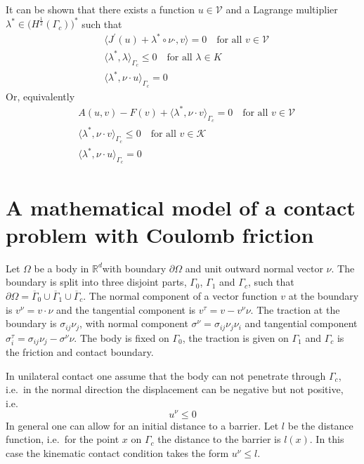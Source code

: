 \documentclass[12pt,a4paper]{article}
\numberwithin{equation}{section}
\numberwithin{table}{section}
\numberwithin{figure}{section}
\newcommand{\R}{\ensuremath{\mathbb{R}}}
\newcommand{\Rd}{\ensuremath{\R^d}}
\newcommand{\half}{\ensuremath{\frac{1}{2}}}
\newcommand{\dOmega}{{\partial\Omega}}
\newcommand{\V}{\ensuremath{\mathcal{V}}}
\newcommand{\K}{\ensuremath{\mathcal{K}}}
\newcommand{\stress}[1][]{\ensuremath{\sigma_{#1}}}
\newcommand{\sigij}{\stress[ij]}
\providecommand{\dualp}[2]{\langle #1, #2 \rangle}
\begin{document}
It can be shown that there exists a function $u\in\V$ and a Lagrange multiplier
$\lambda^* \in \bigl(H^{\half}(\Gamma_c)\bigr)^*$ such that
\begin{align}
  &\dualp{J^\prime(u) + \lambda^* \circ \nu\cdot}{v} = 0 \quad\text{for all $v\in \V$} \\
  &\dualp{\lambda^*}{\lambda}_{\Gamma_c} \le 0 \quad\text{for all $\lambda\in K$} \\
  &\dualp{\lambda^*}{\nu\cdot u}_{\Gamma_c} = 0
\end{align}
Or, equivalently
\begin{align}
  & A(u,v) - F(v) + \dualp{\lambda^*}{\nu\cdot v}_{\Gamma_c} = 0
  \quad\text{for all $v\in \V$} \\
  &\dualp{\lambda^*}{\nu\cdot v}_{\Gamma_c} \le 0 \quad\text{for all $v\in \K$} \\
  &\dualp{\lambda^*}{\nu\cdot u}_{\Gamma_c} = 0
\end{align}



\section{A mathematical model of a contact problem with Coulomb friction}
\label{sec:math-model-cont}

Let $\Omega$ be a body in \Rd with boundary $\dOmega$ and unit outward normal vector
$\nu$.  The boundary is split into three disjoint parts, $\Gamma_0$, $\Gamma_1$ and
$\Gamma_c$, such that $\dOmega = \overline{\Gamma}_0 \cup \overline{\Gamma}_1 \cup
\overline{\Gamma}_c$.  The normal component of a vector function $v$ at the boundary is
$v^\nu = v\cdot\nu$ and the tangential component is $v^\tau = v - v^\nu \nu$.  The
traction at the boundary is $\sigij\nu_j$, with normal component $\sigma^\nu =
\sigij\nu_j\nu_i$ and tangential component $\sigma_i^\tau = \sigij\nu_j - \sigma^\nu \nu$.
The body is fixed on $\Gamma_0$, the traction is given on $\Gamma_1$ and $\Gamma_c$ is the
friction and contact boundary.

In unilateral contact one assume that the body can not penetrate
through $\Gamma_c$, i.e.\ in the normal direction the displacement can
be negative but not positive, i.e.\
\begin{equation}
  u^\nu \le 0
\end{equation}
In general one can allow for an initial distance to a barrier. Let $l$
be the distance function, i.e.\ for the point $x$ on $\Gamma_c$ the
distance to the barrier is $l(x)$.  In this case the kinematic contact
condition takes the form $u^\nu \le l$.
\end{document}
